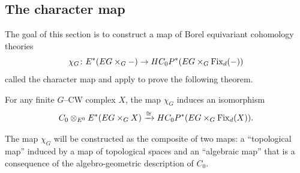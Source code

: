 

\subsection*{The character map}


The goal of this section is to construct a map of Borel equivariant cohomology theories 
\[
\chi_G \colon E^*(EG \times_G -) \rightarrow HC_{0}P^{*}(EG \times_G \operatorname{Fix}_d(-))
\]
called the character map and apply  to prove the following theorem.

\begin{theorem} \label{app:mainthm1}
For any finite \(G\)--CW complex \(X\), the map \(\chi_G\) induces an isomorphism
\[
C_0 \otimes_{E^0} E^*(EG \times_G X) \xrightarrow{\cong} HC_{0}P^{*}(EG \times_G \operatorname{Fix}_d(X)).
\]
\end{theorem}

The map \(\chi_G\) will be constructed as the composite of two maps: a ``topological map'' induced by a map of topological spaces and an ``algebraic map'' that is a consequence of the algebro-geometric description of \(C_0\).

